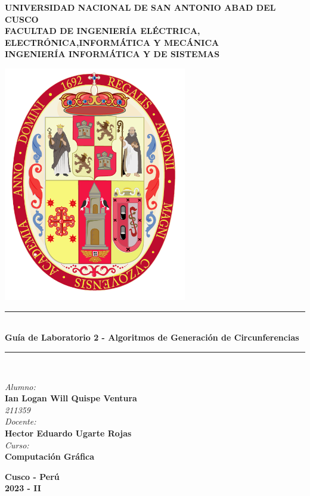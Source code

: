 \documentclass[a4paper]{article}
\begin{document}
\begin{titlepage}

\newcommand{\linea}{\rule{\linewidth}{0.7mm}} 
\center
\textbf{\Large UNIVERSIDAD NACIONAL DE SAN ANTONIO ABAD DEL CUSCO}\\[0.2cm]
\textbf{\Large FACULTAD DE INGENIERÍA ELÉCTRICA, ELECTRÓNICA,INFORMÁTICA Y MECÁNICA}\\[0.2cm]
\textbf{\Large INGENIERÍA INFORMÁTICA Y DE SISTEMAS\\[0.6cm]}

\includegraphics[width=8cm]{src/escudo-unsaac.png}
\vfill

\linea
\\[0.3cm]
\textbf{\LARGE Guía de Laboratorio 2 - Algoritmos de Generación de Circunferencias}\\[0.2cm]
\linea \\
\vfill

\textit{\Large Alumno:}\\
    \textbf{\large Ian Logan Will Quispe Ventura}\\
    \textit{211359}\\

\vspace{0.3cm}
    \textit{\Large Docente:}\\
    \textbf{\large Hector Eduardo Ugarte Rojas}\\
\vspace{0.5cm}
    \textit{\Large Curso:}\\
    \textbf{\large Computación Gráfica}\\
    \vfill

\vspace{0.4cm}
    \textbf{\Large Cusco - Perú }\\
    \textbf{\large 2023 - II }\\
    \newpage
    \end{titlepage}
\end{document}
